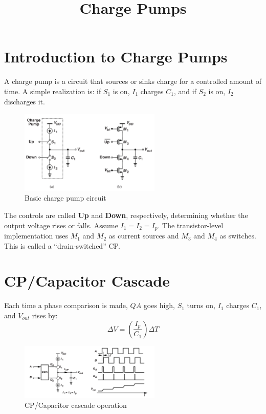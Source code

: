\documentclass[12pt]{article}
\title{Charge Pumps}
\author{}
\date{}
\begin{document}
\maketitle

\section{Introduction to Charge Pumps}
A charge pump is a circuit that sources or sinks charge for a controlled amount of time. A simple realization is: if $S_1$ is on, $I_1$ charges $C_1$, and if $S_2$ is on, $I_2$ discharges it.

\begin{figure}[H]
    \centering
    \includegraphics[width=0.6\textwidth]{figs/cp1}
    \caption{Basic charge pump circuit}
\end{figure}

The controls are called \textbf{Up} and \textbf{Down}, respectively, determining whether the output voltage rises or falls. Assume $I_1 = I_2 = I_p$. The transistor-level implementation uses $M_1$ and $M_2$ as current sources and $M_3$ and $M_4$ as switches. This is called a “drain-switched” CP.

\section{CP/Capacitor Cascade}
Each time a phase comparison is made, $QA$ goes high, $S_1$ turns on, $I_1$ charges $C_1$, and $V_{out}$ rises by:
\[
\Delta V = \left(\frac{I_p}{C_1}\right)\Delta T
\]

\begin{figure}[H]
    \centering
    \includegraphics[width=0.6\textwidth]{figs/cp2}
    \caption{CP/Capacitor cascade operation}
\end{figure}
\end{document}
